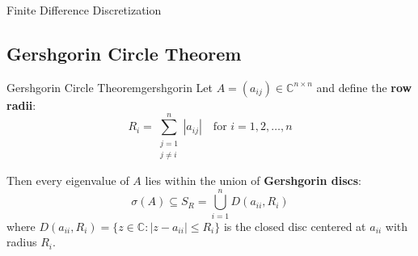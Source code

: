 \begin{example}{Finite Difference Discretization}{}
\begin{center}
    \end{center}
\end{example}

\subsection{Gershgorin Circle Theorem}

\begin{theorem}{Gershgorin Circle Theorem}{gershgorin}
    Let $A = (a_{ij}) \in \mathbb{C}^{n \times n}$ and define the \textbf{row radii}:
    \begin{equation}
        R_i = \sum_{\substack{j=1 \\ j \neq i}}^n |a_{ij}| \quad \text{for } i = 1, 2, \ldots, n
    \end{equation}

    Then every eigenvalue of $A$ lies within the union of \textbf{Gershgorin discs}:
    \begin{equation}
        \sigma(A) \subseteq S_R = \bigcup_{i=1}^n D(a_{ii}, R_i)
    \end{equation}
    where $D(a_{ii}, R_i) = \{ z \in \mathbb{C} : |z - a_{ii}| \leq R_i \}$ is the closed disc centered at $a_{ii}$ with radius $R_i$.
\end{theorem}

